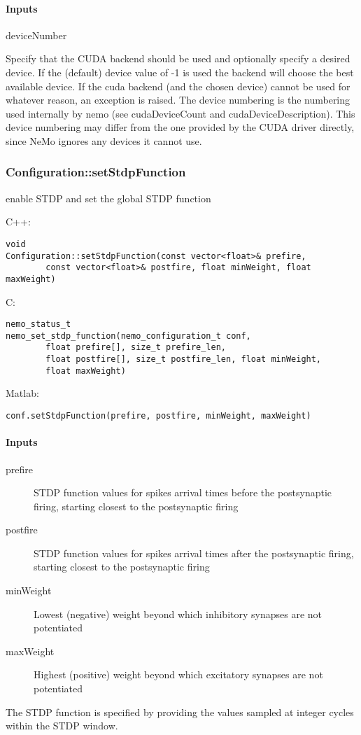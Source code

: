 \paragraph{Inputs}
\begin{description}
\item[deviceNumber]
\end{description}
Specify that the CUDA backend should be used and optionally specify a desired device. If the (default) device value of -1 is used the backend will choose the best available device.   If the cuda backend (and the chosen device) cannot be used for  whatever reason, an exception is raised.   The device numbering is the numbering used internally by nemo (see  cudaDeviceCount and cudaDeviceDescription). This device  numbering may differ from the one provided by the CUDA driver  directly, since NeMo ignores any devices it cannot use. 

\clearpage
\subsubsection*{Configuration::setStdpFunction}
\label{fn: setStdpFunction}
enable STDP and set the global STDP function


\noindent C++:
\begin{lstlisting}[aboveskip=2pt]
void
Configuration::setStdpFunction(const vector<float>& prefire, 
        const vector<float>& postfire, float minWeight, float maxWeight)
\end{lstlisting}

\noindent C:
\begin{lstlisting}[aboveskip=2pt]
nemo_status_t
nemo_set_stdp_function(nemo_configuration_t conf, 
        float prefire[], size_t prefire_len, 
        float postfire[], size_t postfire_len, float minWeight, 
        float maxWeight)
\end{lstlisting}

\noindent Matlab:
\begin{lstlisting}[aboveskip=2pt]
conf.setStdpFunction(prefire, postfire, minWeight, maxWeight)
\end{lstlisting}
\paragraph{Inputs}
\begin{description}
\item[prefire] STDP function values for spikes arrival times before the postsynaptic firing, starting closest to the postsynaptic firing
\item[postfire] STDP function values for spikes arrival times after the postsynaptic firing, starting closest to the postsynaptic firing
\item[minWeight] Lowest (negative) weight beyond which inhibitory synapses are not potentiated
\item[maxWeight] Highest (positive) weight beyond which excitatory synapses are not potentiated
\end{description}
The STDP function is specified by providing the values sampled at integer cycles within the STDP window.

